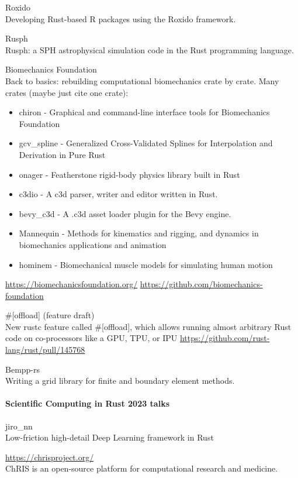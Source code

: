 \documentclass{article}
\begin{document}
Roxido\\
Developing Rust-based R packages using the Roxido framework.

Rusph\\
Rusph: a SPH astrophysical simulation code in the Rust programming language.

Biomechanics Foundation\\
Back to basics: rebuilding computational biomechanics crate by crate.
Many crates (maybe just cite one crate):
\begin{itemize}
    \item chiron - Graphical and command-line interface tools for Biomechanics Foundation
    \item gcv\_spline - Generalized Cross-Validated Splines for Interpolation and Derivation in Pure Rust
    \item onager - Featherstone rigid-body physics library built in Rust
    \item c3dio - A c3d parser, writer and editor written in Rust.
    \item bevy\_c3d - A .c3d asset loader plugin for the Bevy engine.
    \item Mannequin - Methods for kinematics and rigging, and dynamics in biomechanics applications and
          animation
    \item hominem - Biomechanical muscle models for simulating human motion
\end{itemize}
\url{https://biomechanicsfoundation.org/}
\url{https://github.com/biomechanics-foundation}

\#[offload] (feature draft)\\
New rustc feature called \#[offload], which allows running almost arbitrary Rust code on
co-processors like a GPU, TPU, or IPU
\url{https://github.com/rust-lang/rust/pull/145768}

Bempp-rs\\
Writing a grid library for finite and boundary element methods. \cite{Witherden2015}

\paragraph{Scientific Computing in Rust 2023 talks}

jiro\_nn\\
Low-friction high-detail Deep Learning framework in Rust

\url{https://chrisproject.org/}\\
ChRIS is an open-source platform for computational research and medicine.
\end{document}
